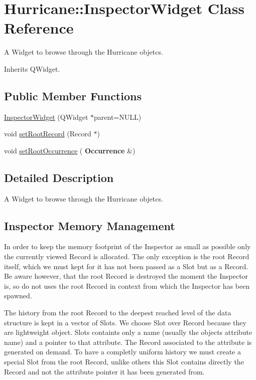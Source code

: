 \hypertarget{classHurricane_1_1InspectorWidget}{}\section{Hurricane\+:\+:Inspector\+Widget Class Reference}
\label{classHurricane_1_1InspectorWidget}


A Widget to browse through the Hurricane objetcs.  




Inherits Q\+Widget.

\subsection*{Public Member Functions}
\begin{DoxyCompactItemize}
\item 
\hyperlink{classHurricane_1_1InspectorWidget_a6071f331a8d27bf45103aa91981e4ebb}{Inspector\+Widget} (Q\+Widget $\ast$parent=N\+U\+LL)
\item 
void \hyperlink{classHurricane_1_1InspectorWidget_aebc3241d7cf15d3e2ca7478c278c6a35}{set\+Root\+Record} (Record $\ast$)
\item 
void \hyperlink{classHurricane_1_1InspectorWidget_a79914005284bdc8426c90f3440714bb4}{set\+Root\+Occurrence} (\textbf{ Occurrence} \&)
\end{DoxyCompactItemize}


\subsection{Detailed Description}
A Widget to browse through the Hurricane objetcs. 

\hypertarget{classHurricane_1_1InspectorWidget_secInspectorMM}{}\subsection{Inspector Memory Management}\label{classHurricane_1_1InspectorWidget_secInspectorMM}
In order to keep the memory footprint of the Inspector as small as possible only the currently viewed Record is allocated. The only exception is the root Record itself, which we must kept for it has not been passed as a Slot but as a Record. Be aware however, that the root Record is destroyed the moment the Inspector is, so do not uses the root Record in context from which the Inspector has been spawned.

The history from the root Record to the deepest reached level of the data structure is kept in a vector of Slots. We choose Slot over Record because they are lightweight object. Slots containts only a name (usually the object\textquotesingle{}s attribute name) and a pointer to that attribute. The Record associated to the attribute is generated on demand. To have a completly uniform history we must create a special Slot from the root Record, unlike others this Slot contains directly the Record and not the attribute pointer it has been generated from.


